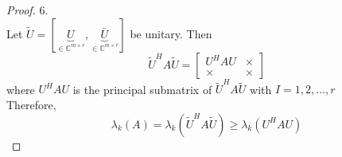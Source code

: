 \begin{multicols}{2}
\begin{proof} 6. \\
    Let $\tilde{U}=[\underbrace{U}_{\in\mathbb{C}^{m\times r}}, \underbrace{\bar{U}}_{\in\mathbb{C}^{m\times r}}]$ be unitary. Then
    \[
        \tilde{U}^HA\tilde{U} = \begin{bmatrix}
            U^HAU  & \times \\
            \times & \times
        \end{bmatrix}
    \]
    where $U^HAU$ is the principal submatrix of $\tilde{U}^HA\tilde{U}$ with $I={1,2,...,r}$\\
    Therefore, 
    \[
        \lambda_k(A) = \lambda_k(\tilde{U}^HA\tilde{U}) \geq \lambda_k(U^HAU)
    \]
\end{proof}
\newpage
\end{multicols}